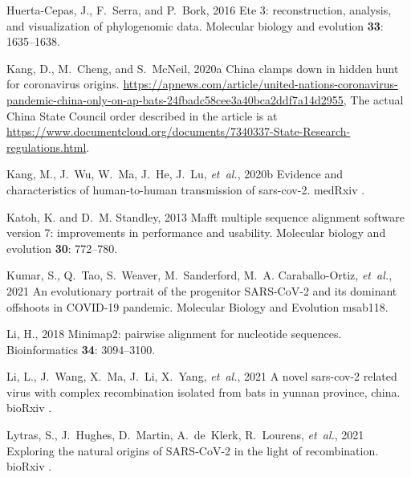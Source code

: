 \documentclass[9pt,twocolumn,twoside]{gsajnl_modified}
\begin{document}
\begin{thebibliography}{47}
{Huerta-Cepas, J., F.~Serra, {\rm and} P.~Bork}, 2016 Ete 3: reconstruction,
  analysis, and visualization of phylogenomic data. Molecular biology and
  evolution {\bf 33}: 1635--1638.

{Kang, D., M.~Cheng, {\rm and} S.~McNeil}, 2020{a} China clamps down in hidden
  hunt for coronavirus origins.
  \url{https://apnews.com/article/united-nations-coronavirus-pandemic-china-only-on-ap-bats-24fbadc58cee3a40bca2ddf7a14d2955},
  The actual China State Council order described in the article is at
  \url{https://www.documentcloud.org/documents/7340337-State-Research-regulations.html}.

{Kang, M., J.~Wu, W.~Ma, J.~He, J.~Lu, {\em et~al.\/}}, 2020{b} Evidence and
  characteristics of human-to-human transmission of sars-cov-2. medRxiv .

{Katoh, K. {\rm and} D.~M. Standley}, 2013 Mafft multiple sequence alignment
  software version 7: improvements in performance and usability. Molecular
  biology and evolution {\bf 30}: 772--780.

{Kumar, S., Q.~Tao, S.~Weaver, M.~Sanderford, M.~A. Caraballo-Ortiz, {\em
  et~al.\/}}, 2021 An evolutionary portrait of the progenitor {SARS-CoV-2} and
  its dominant offshoots in {COVID-19} pandemic. Molecular Biology and
  Evolution msab118.

{Li, H.}, 2018 Minimap2: pairwise alignment for nucleotide sequences.
  Bioinformatics {\bf 34}: 3094--3100.

{Li, L., J.~Wang, X.~Ma, J.~Li, X.~Yang, {\em et~al.\/}}, 2021 A novel
  sars-cov-2 related virus with complex recombination isolated from bats in
  yunnan province, china. bioRxiv .

{Lytras, S., J.~Hughes, D.~Martin, A.~de~Klerk, R.~Lourens, {\em et~al.\/}},
  2021 {Exploring the natural origins of SARS-CoV-2 in the light of
  recombination}. bioRxiv .


\end{thebibliography}
\end{document}
